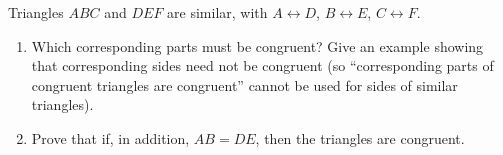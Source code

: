 Triangles $ABC$ and $DEF$ are similar, with $A\leftrightarrow D$, $B\leftrightarrow E$, $C\leftrightarrow F$.
\begin{enumerate}
\item[(a)] Which corresponding parts must be congruent? Give an example showing that corresponding sides need not be congruent (so ``corresponding parts of congruent triangles are congruent'' cannot be used for sides of similar triangles).
\item[(b)] Prove that if, in addition, $AB=DE$, then the triangles are congruent.
\end{enumerate}
